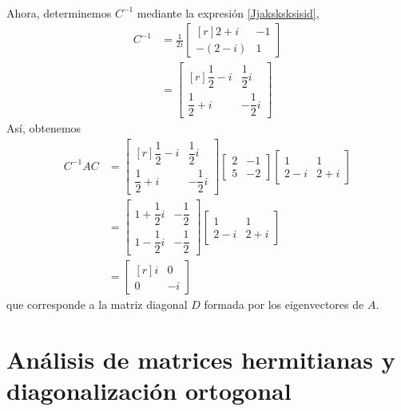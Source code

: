 \begin{example}
\begin{align*}
    \end{align*}
    Ahora, determinemos $C^{-1}$ mediante la expresión \ref{Jjaksksksisid},
    \begin{align*}
        C^{-1} & = \frac{1}{2i} \begin{bmatrix*}[r]
            2 + i & - 1 \\
            -(2 - i) & 1
        \end{bmatrix*} \\
        & = \begin{bmatrix*}[r]
            \dfrac{1}{2} - i & \dfrac{1}{2}i \\[2mm]
            \dfrac{1}{2} + i & - \dfrac{1}{2}i
        \end{bmatrix*}
    \end{align*}
    Así, obtenemos
    \begin{align*}
        C^{-1}AC & = \begin{bmatrix*}[r]
            \dfrac{1}{2} - i & \dfrac{1}{2}i \\[2mm]
            \dfrac{1}{2} + i & - \dfrac{1}{2}i
        \end{bmatrix*} \begin{bmatrix*}
            2 & - 1 \\
            5 & - 2
        \end{bmatrix*} \begin{bmatrix}
            1 & 1 \\
            2 - i & 2 + i
        \end{bmatrix} \\
        & = \begin{bmatrix}
            1 + \dfrac{1}{2}i & - \dfrac{1}{2} \\[2mm]
            1 - \dfrac{1}{2}i & - \dfrac{1}{2}
        \end{bmatrix} \begin{bmatrix}
            1 & 1 \\
            2 - i & 2 + i
        \end{bmatrix} \\
        & = \begin{bmatrix*}[r]
            i & 0 \\
            0 & - i
        \end{bmatrix*}
    \end{align*}
    que corresponde a la matriz diagonal $D$ formada por los eigenvectores de $A$.
\end{example}

\section{Análisis de matrices hermitianas y diagonalización ortogonal}\label{sec:matrices_sim_her_uni}

